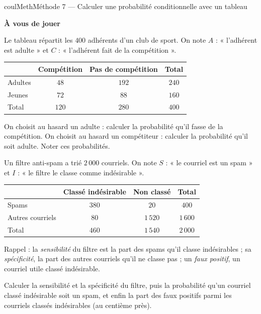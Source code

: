 \documentclass[11pt,a4paper]{article}
\makeatletter
\newcounter{lycee@signet}
\newcommand{\signet}[3][]{\stepcounter{lycee@signet}%
  \edef\lycee@dest{\if\relax\detokenize{#1}\relax
    signet.\arabic{lycee@signet}\else#1\fi}%
  \hypertarget{\lycee@dest}{}\bookmark[level=#2,dest=\lycee@dest]{#3}}
\newcounter{methode}
\newenvironment{methodebox}[1][Méthode]{\stepcounter{methode}%
  \begin{boitecours}[phantom={\signet[methode-\arabic{methode}]{2}{#1}}]{coulMeth}{#1}}%
  {\end{boitecours}}
\newcommand{\etape}[1]{\par\smallskip\textbf{\color{coulMeth}#1}\par\nobreak\smallskip}
\makeatother
\begin{document}
\begin{methodebox}[Méthode 7 --- Calculer une probabilité conditionnelle avec un tableau]
\etape{À vous de jouer}
\begin{questions}[label=\alph*)]
  \item Le tableau répartit les $400$ adhérents d'un club de sport. On note $A$ :
    « l'adhérent est adulte » et $C$ : « l'adhérent fait de la compétition ».
    \begin{center}
    \renewcommand{\arraystretch}{1.5}
    \begin{tabular}{|l|c|c|c|}
    \hline
     & Compétition & Pas de compétition & Total \\
    \hline
    Adultes & $48$ & $192$ & $240$ \\
    \hline
    Jeunes & $72$ & $88$ & $160$ \\
    \hline
    Total & $120$ & $280$ & $400$ \\
    \hline
    \end{tabular}
    \end{center}
    On choisit au hasard un adulte : calculer la probabilité qu'il fasse de la
    compétition. On choisit au hasard un compétiteur : calculer la probabilité qu'il
    soit adulte. Noter ces probabilités.
  \item Un filtre anti-spam a trié $2\,000$ courriels. On note $S$ : « le courriel est
    un spam » et $I$ : « le filtre le classe comme indésirable ».
    \begin{center}
    \renewcommand{\arraystretch}{1.5}
    \begin{tabular}{|l|c|c|c|}
    \hline
     & Classé indésirable & Non classé & Total \\
    \hline
    Spams & $380$ & $20$ & $400$ \\
    \hline
    Autres courriels & $80$ & $1\,520$ & $1\,600$ \\
    \hline
    Total & $460$ & $1\,540$ & $2\,000$ \\
    \hline
    \end{tabular}
    \end{center}
    Rappel : la \emph{sensibilité} du filtre est la part des spams qu'il classe
    indésirables ; sa \emph{spécificité}, la part des autres courriels qu'il ne classe
    pas ; un \emph{faux positif}, un courriel utile classé indésirable.

    Calculer la sensibilité et la spécificité du filtre, puis la probabilité qu'un
    courriel classé indésirable soit un spam, et enfin la part des faux positifs parmi
    les courriels classés indésirables (au centième près).
\end{questions}

\end{methodebox}
\end{document}
